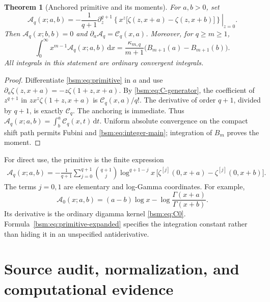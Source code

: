 \documentclass[11pt,letterpaper]{article}
\numberwithin{equation}{section}
\newtheorem{theorem}{Theorem}[section]
\theoremstyle{definition}\newtheorem{definition}[theorem]{Definition}
\theoremstyle{remark}\newtheorem{remark}[theorem]{Remark}
\newcommand{\dd}{\,\mathrm{d}}
\newcommand{\Ccal}{\mathcal C}
\newcommand{\Acal}{\mathcal A}
\begin{document}
\begin{theorem}[Anchored primitive and its moments]\label{bsm:thm:primitive}
For $a,b>0$, set
\begin{equation}\label{bsm:eq:primitive}
 \Acal_q(x;a,b)=
 -\frac1{q+1}\left.\partial_z^{q+1}
       \left\{x^z\bigl[\zeta(z,x+a)-\zeta(z,x+b)\bigr]\right\}
                                                    \right|_{z=0}.
\end{equation}
Then $\Acal_q(x;b,b)=0$ and $\partial_a\Acal_q=\Ccal_q(x,a)$.
Moreover, for $q\ge m\ge1$,
\begin{equation}\label{bsm:eq:primitive-moment}
 \int_0^\infty x^{m-1}\Acal_q(x;a,b)\dd x
   =\frac{\kappa_{m,q}}{m+1}
                  \bigl(B_{m+1}(a)-B_{m+1}(b)\bigr).
\end{equation}
All integrals in this statement are ordinary convergent integrals.
\end{theorem}
\begin{proof}
Differentiate \eqref{bsm:eq:primitive} in $a$ and use
$\partial_a\zeta(z,x+a)=-z\zeta(1+z,x+a)$. By
\eqref{bsm:eq:C-generator}, the coefficient of $z^{q+1}$ in
$z x^z\zeta(1+z,x+a)$ is $\Ccal_q(x,a)/q!$. The derivative of
order $q+1$, divided by $q+1$, is exactly $\Ccal_q$.
The anchoring is immediate. Thus
$\Acal_q(x;a,b)=\int_b^a\Ccal_q(x,t)\dd t$.
Uniform absolute convergence on the compact shift path permits Fubini
and \eqref{bsm:eq:integer-main}; integration of $B_m$ proves the moment.
\end{proof}

For direct use, the primitive is the finite expression
\begin{align}\label{bsm:eq:primitive-expanded}
 \Acal_q(x;a,b)= -\frac1{q+1}
 \sum_{j=0}^{q+1}\binom{q+1}{j}\log^{q+1-j}x\,
    \bigl[\zeta^{[j]}(0,x+a)-\zeta^{[j]}(0,x+b)\bigr].
\end{align}
The terms $j=0,1$ are elementary and log-Gamma coordinates. For
example,
\begin{equation}\label{bsm:eq:A0}
 \Acal_0(x;a,b)=(a-b)\log x-
                             \log\frac{\Gamma(x+a)}{\Gamma(x+b)}.
\end{equation}
Its derivative is the ordinary digamma kernel \eqref{bsm:eq:C0}.
Formula~\eqref{bsm:eq:primitive-expanded} specifies the integration
constant rather than hiding it in an unspecified antiderivative.

\section{Source audit, normalization, and computational evidence}\label{bsm:sec:audit}
\end{document}
